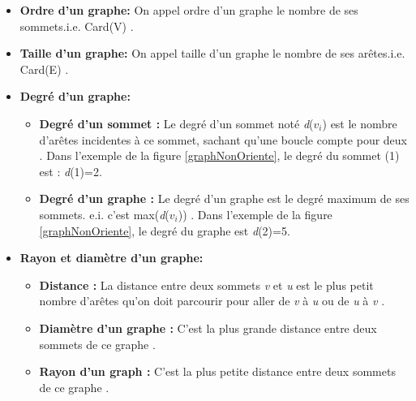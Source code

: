 		\begin{itemize}[label=$\circ$]
			
			\item \textbf{Ordre d'un graphe:} On appel ordre d’un 					graphe le nombre de ses sommets.i.e. Card(V) \citep{DUT}.
			
			\item  \textbf{Taille d'un graphe:} On appel taille d’un 				graphe le nombre de ses arêtes.i.e. Card(E) \citep{DUT}.
			
			\item  \textbf{Degré d'un graphe:}
			
			
			\begin{itemize}[label=$\bullet$]
				\item \textbf{Degré d'un sommet : } Le degré d’un sommet noté \textit{d}($\textit{v}_{i}$) est le nombre d'arêtes incidentes à ce sommet, sachant qu’une boucle compte pour deux \citep{muller} . Dans l'exemple de la figure \ref{graphNonOriente}, le degré du sommet (1) est : \textit{d}(1)=2.
				
				\item \textbf{Degré d'un graphe : }Le degré d’un graphe est le degré maximum de ses sommets. e.i. c’est 						max(\textit{d}($\textit{v}_{i}$)) \citep{muller}. Dans l’exemple de 				la figure \ref{graphNonOriente}, le degré du graphe est \textit{d}(2)=5.
			\end{itemize}
			
			\item \textbf{Rayon et diamètre d'un graphe:}
			\begin{itemize}[label=$\bullet$]
				\item \textbf{Distance : }La distance entre deux sommets 	\textit{v} et \textit{u} est le plus petit nombre d’arêtes qu’on doit parcourir pour aller de \textit{v} à \textit{u} ou de \textit{u} à \textit{v} \citep{muller}. 
				
				\item 	\textbf{Diamètre d’un graphe :} C’est la plus grande 	distance entre deux sommets de ce graphe \citep{muller}. 
				
				\item 	\textbf{Rayon d’un graph : }C’est la plus petite distance entre deux sommets de ce graphe \citep{parlebas1972centralite}. 
			\end{itemize}
		\end{itemize}
		
	
			
	